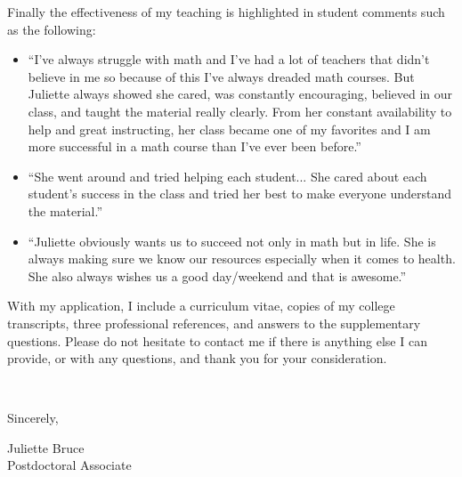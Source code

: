 \documentclass[11pt]{article}
\begin{document}
Finally the effectiveness of my teaching is highlighted in student comments such as the following:
\begin{itemize}[leftmargin=*]
\item ``I’ve always struggle with math and I’ve had a lot of teachers that didn’t believe in me so because of this I’ve always dreaded math courses. But Juliette always showed she cared, was constantly encouraging, believed in our class, and taught the material really clearly. From her constant availability to help and great instructing, her class became one of my favorites and I am more successful in a math course than I’ve ever been before.''
\item ``She went around and tried helping each student... She cared about each student’s success in the class and tried her best to make everyone understand the material.''
\item ``Juliette obviously wants us to succeed not only in math but in life. She is always making sure we know our resources especially when it comes to health. She also always wishes us a good day/weekend and that is awesome.''
\end{itemize}

With my application, I include a curriculum vitae, copies of my college transcripts, three professional references, and answers to the supplementary questions.  Please do not hesitate to contact me if there is anything else I can provide, or with any questions, and thank you for your consideration. 

\vspace{24pt}
\noindent
\begin{minipage}{0.99\textwidth}
\begin{minipage}{0.69\textwidth}
\textcolor{white}{.}
\end{minipage}
\begin{minipage}{0.29\textwidth}
Sincerely, 

\vspace{20pt}
Juliette Bruce\\
Postdoctoral Associate\end{minipage}
\end{minipage}

\end{document}
